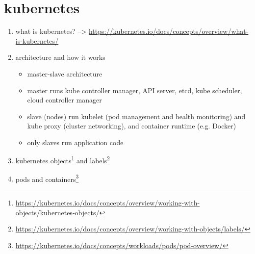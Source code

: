 \section[Kubernetes]{\gls{kubernetes}}
  \begin{enumerate}
    \item what is \gls{kubernetes}? --> \url{https://kubernetes.io/docs/concepts/overview/what-is-kubernetes/}
    \item architecture and how it works
      \begin{itemize}
        \item master-slave architecture
        \item master runs kube controller manager, API server, etcd, kube scheduler, cloud controller manager
        \item slave (nodes) run kubelet (pod management and health monitoring) and kube proxy (cluster networking), and container runtime (e.g. Docker)
        \item only slaves run application code
      \end{itemize}
    \item \gls{kubernetes} objects\footnote{\url{https://kubernetes.io/docs/concepts/overview/working-with-objects/kubernetes-objects/}} and labels\footnote{\url{https://kubernetes.io/docs/concepts/overview/working-with-objects/labels/}}
    \item pods and containers\footnote{\url{https://kubernetes.io/docs/concepts/workloads/pods/pod-overview/}}
  \end{enumerate}
